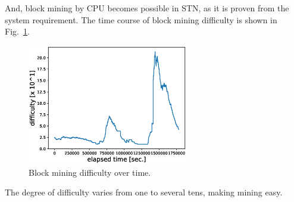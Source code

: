 \documentclass[graybox]{svmult}
\begin{document}
And, block mining by CPU becomes possible in STN, as it is proven from the system requirement.
The time course of block mining difficulty is shown in Fig.~\ref{fig:difficulty}.
%
\begin{figure}[t]
  \vspace{-35mm}
  \begin{center}
    \includegraphics[width=70mm]{time_vs_difficulty-plot.eps}
  \end{center}
  \vspace{35mm}
  \caption{Block mining difficulty over time.}
  \label{fig:difficulty}
\end{figure}
%
The degree of difficulty varies from one to several tens, making mining easy.
\end{document}
